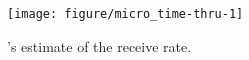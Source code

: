 \begin{figure}[t]
    \centering
\begin{knitrout}
\color{fgcolor}
\texttt{[image: figure/micro\_time-thru-1]} 

\end{knitrout}

    \caption{\name's estimate of the receive rate.}
    \label{fig:micro:time-thru}
\end{figure}
